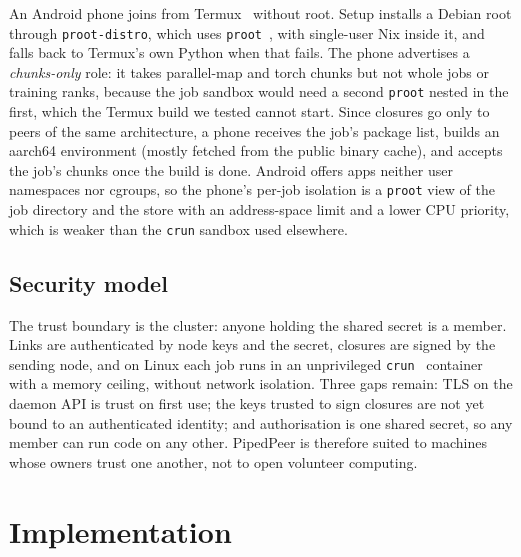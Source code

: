 \documentclass[5p,times,twocolumn]{elsarticle}
\begin{document}
An Android phone joins from Termux~\cite{termux} without root. Setup installs a
Debian root through \texttt{proot-distro}, which uses
\texttt{proot}~\cite{proot}, with single-user Nix inside it, and falls back to
Termux's own Python when that fails. The phone advertises a
\emph{chunks-only} role: it takes parallel-map and torch chunks but not whole
jobs or training ranks, because the job sandbox would need a second
\texttt{proot} nested in the first, which the Termux build we tested cannot
start. Since closures go only to peers of the same architecture, a phone
receives the job's package list, builds an aarch64 environment (mostly fetched
from the public binary cache), and accepts the job's chunks once the build is
done. Android offers apps neither user namespaces nor cgroups, so the phone's
per-job isolation is a \texttt{proot} view of the job directory and the store
with an address-space limit and a lower CPU priority, which is weaker than the
\texttt{crun} sandbox used elsewhere.

\subsection{Security model}
\label{sec:security}

The trust boundary is the cluster: anyone holding the shared secret is a
member. Links are authenticated by node keys and the secret, closures are
signed by the sending node, and on Linux each job runs in an unprivileged
\texttt{crun}~\cite{crun} container with a memory ceiling, without network
isolation. Three gaps remain: TLS on the daemon API is trust on first use; the
keys trusted to sign closures are not yet bound to an authenticated identity;
and authorisation is one shared secret, so any member can run code on any
other. PipedPeer is therefore suited to machines whose owners trust one
another, not to open volunteer computing.

\section{Implementation}
\label{sec:impl}
\end{document}
